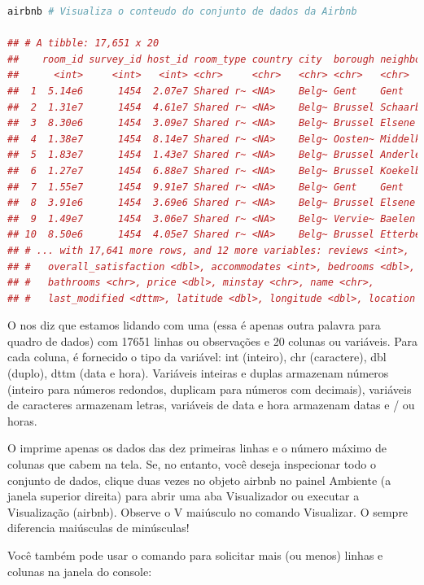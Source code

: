 \documentclass{article}
\begin{document}
\begin{lstlisting}[language=R]
airbnb # Visualiza o conteudo do conjunto de dados da Airbnb

## # A tibble: 17,651 x 20
##    room_id survey_id host_id room_type country city  borough neighborhood
##      <int>     <int>   <int> <chr>     <chr>   <chr> <chr>   <chr>       
##  1  5.14e6      1454  2.07e7 Shared r~ <NA>    Belg~ Gent    Gent        
##  2  1.31e7      1454  4.61e7 Shared r~ <NA>    Belg~ Brussel Schaarbeek  
##  3  8.30e6      1454  3.09e7 Shared r~ <NA>    Belg~ Brussel Elsene      
##  4  1.38e7      1454  8.14e7 Shared r~ <NA>    Belg~ Oosten~ Middelkerke 
##  5  1.83e7      1454  1.43e7 Shared r~ <NA>    Belg~ Brussel Anderlecht  
##  6  1.27e7      1454  6.88e7 Shared r~ <NA>    Belg~ Brussel Koekelberg  
##  7  1.55e7      1454  9.91e7 Shared r~ <NA>    Belg~ Gent    Gent        
##  8  3.91e6      1454  3.69e6 Shared r~ <NA>    Belg~ Brussel Elsene      
##  9  1.49e7      1454  3.06e7 Shared r~ <NA>    Belg~ Vervie~ Baelen      
## 10  8.50e6      1454  4.05e7 Shared r~ <NA>    Belg~ Brussel Etterbeek   
## # ... with 17,641 more rows, and 12 more variables: reviews <int>,
## #   overall_satisfaction <dbl>, accommodates <int>, bedrooms <dbl>,
## #   bathrooms <chr>, price <dbl>, minstay <chr>, name <chr>,
## #   last_modified <dttm>, latitude <dbl>, longitude <dbl>, location <chr>
\end{lstlisting}


O \faRProject nos diz que estamos lidando com uma  (essa é apenas outra palavra para quadro de dados) com 17651 linhas ou observações e 20 colunas ou variáveis. Para cada coluna, é fornecido o tipo da variável: int (inteiro), chr (caractere), dbl (duplo), dttm (data e hora). Variáveis inteiras e duplas armazenam números (inteiro para números redondos, duplicam para números com decimais), variáveis de caracteres armazenam letras, variáveis de data e hora armazenam datas e / ou horas.

O \faRProject imprime apenas os dados das dez primeiras linhas e o número máximo de colunas que cabem na tela. Se, no entanto, você deseja inspecionar todo o conjunto de dados, clique duas vezes no objeto airbnb no painel Ambiente (a janela superior direita) para abrir uma aba Visualizador ou executar a Visualização (airbnb). Observe o V maiúsculo no comando Visualizar. O \faRProject sempre diferencia maiúsculas de minúsculas!

Você também pode usar o comando  para solicitar mais (ou menos) linhas e colunas na janela do console:
\end{document}
